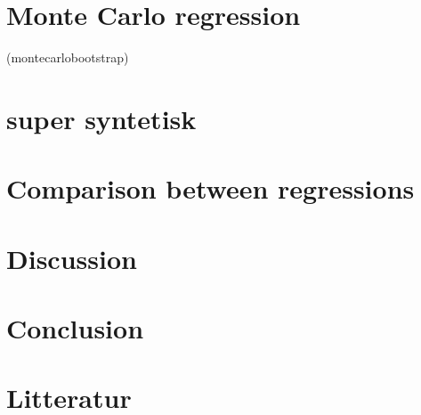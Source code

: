 \documentclass{article}
\begin{document}
	\section{Monte Carlo regression}
	\newpage
	
	(montecarlobootstrap)
	
	
		\section{super syntetisk}
	
	\newpage
	
	\section{Comparison between regressions}
	\newpage
	
	\section{Discussion}
	\newpage
	
	\section{Conclusion}
	\newpage
	
 	\section{Litteratur}
  
\end{document}
